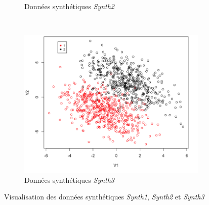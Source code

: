 \documentclass[a4paper,10pt]{report}
\begin{document}
\begin{figure}[H]
\begin{subfigure}[b]{0.5\linewidth}
		\caption{\small Données synthétiques \textit{Synth2}}
	\end{subfigure}\\%
	\begin{subfigure}[b]{0.5\linewidth}
		\centering
		\captionsetup{justification=centering, margin=1cm}
		\includegraphics[width=1\linewidth]{img/2-1-1-synth3-visualisation}
		\caption{\small Données synthétiques \textit{Synth3}}
	\end{subfigure}%
	\caption{\small Visualisation des données synthétiques \textit{Synth1}, \textit{Synth2} et \textit{Synth3}}
	\label{fig:2-1-1-synth-visualisation}%
\end{figure}
\end{document}
